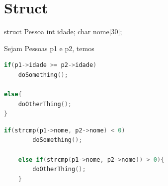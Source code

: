 \section{Struct}

struct Pessoa{
	int idade; 
	char nome[30]; 
}


Sejam Pessoas p1 e p2, temos 

\begin{lstlisting}[language=C]
if(p1->idade >= p2->idade)
	doSomething();

else{
	doOtherThing();
}
\end{lstlisting}

\begin{lstlisting}[language=C]
	if(strcmp(p1->nome, p2->nome) < 0)
		doSomething();
	
	else if(strcmp(p1->nome, p2->nome)) > 0){
		doOtherThing();
	}
\end{lstlisting}
